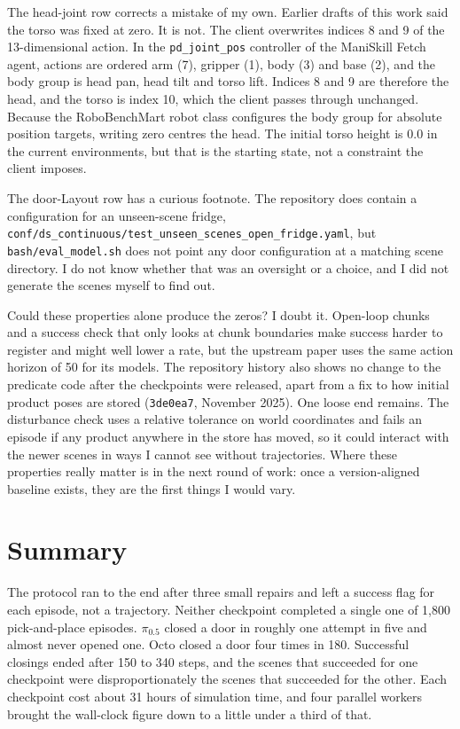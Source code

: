 The head-joint row corrects a mistake of my own. Earlier drafts of this work said the torso was fixed at zero. It is not. The client overwrites indices 8 and 9 of the 13-dimensional action. In the \texttt{pd\_joint\_pos} controller of the ManiSkill Fetch agent, actions are ordered arm (7), gripper (1), body (3) and base (2), and the body group is head pan, head tilt and torso lift. Indices 8 and 9 are therefore the head, and the torso is index 10, which the client passes through unchanged. Because the RoboBenchMart robot class configures the body group for absolute position targets, writing zero centres the head. The initial torso height is 0.0 in the current environments, but that is the starting state, not a constraint the client imposes.

The door-Layout row has a curious footnote. The repository does contain a configuration for an unseen-scene fridge, \texttt{conf/ds\_continuous/test\_unseen\_scenes\_open\_fridge.yaml}, but \texttt{bash/eval\_model.sh} does not point any door configuration at a matching scene directory. I do not know whether that was an oversight or a choice, and I did not generate the scenes myself to find out.

Could these properties alone produce the zeros? I doubt it. Open-loop chunks and a success check that only looks at chunk boundaries make success harder to register and might well lower a rate, but the upstream paper uses the same action horizon of 50 for its models. The repository history also shows no change to the predicate code after the checkpoints were released, apart from a fix to how initial product poses are stored (\texttt{3de0ea7}, November 2025). One loose end remains. The disturbance check uses a relative tolerance on world coordinates and fails an episode if any product anywhere in the store has moved, so it could interact with the newer scenes in ways I cannot see without trajectories. Where these properties really matter is in the next round of work: once a version-aligned baseline exists, they are the first things I would vary.

\section{Summary}
\label{sec:results-summary}

The protocol ran to the end after three small repairs and left a success flag for each episode, not a trajectory. Neither checkpoint completed a single one of 1,800 pick-and-place episodes. $\pi_{0.5}$ closed a door in roughly one attempt in five and almost never opened one. Octo closed a door four times in 180. Successful closings ended after 150 to 340 steps, and the scenes that succeeded for one checkpoint were disproportionately the scenes that succeeded for the other. Each checkpoint cost about 31 hours of simulation time, and four parallel workers brought the wall-clock figure down to a little under a third of that.

